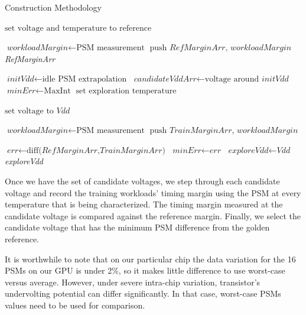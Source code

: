 \begin{algorithm}[h]
\caption{\tistate Construction Methodology}
\label{train-algo}
\begin{algorithmic}[1]
\State $\text{set voltage and temperature to reference}$ 

\State $\textit{workloadMargin} \gets \text{PSM measurement}$
\State $\text{push } \textit{RefMarginArr}\text{, }\textit{workloadMargin}$ 
\EndFor
\Return \textit{RefMarginArr}
\EndProcedure

\State $\textit{initVdd} \gets \text{idle PSM extrapolation}$ 
\State $\textit{candidateVddArr} \gets \text{voltage around }\textit{initVdd}$
\State $\textit{minErr} \gets \text{MaxInt}$ 
\State $\text{set exploration temperature}$

\State $\text{set voltage to } \textit{Vdd}$

\State $\textit{workloadMargin} \gets \text{PSM measurement}$
\State $\text{push } \textit{TrainMarginArr}\text{, }\textit{workloadMargin}$ 
\EndFor

\State $\textit{err} \gets \text{diff(}\textit{RefMarginArr}\text{,}\textit{TrainMarginArr}\text{)}$
\State $\textit{minErr} \gets \textit{err}$
\State $\textit{exploreVdd} \gets \textit{Vdd}$
\EndIf
\EndFor
\Return \textit{exploreVdd}
\EndProcedure

\end{algorithmic}
\end{algorithm}

Once we have the set of candidate voltages, we step through each candidate voltage and record the training workloads' timing margin using the PSM at every temperature that is being characterized. The timing margin measured at the candidate voltage is compared against the reference margin. Finally, we select the candidate voltage that has the minimum PSM difference from the golden reference. 

It is worthwhile to note that on our particular chip the data variation for the 16 PSMs on our GPU is under 2\%, so it makes little difference to use worst-case versus average. However, under severe intra-chip variation, transistor's undervolting potential can differ significantly. In that case, worst-case PSMs values need to be used for comparison.

